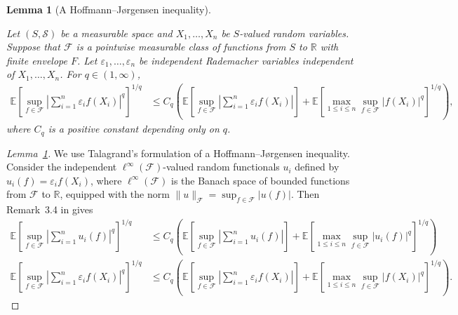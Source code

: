 \documentclass[11pt,lof]{puthesis}
\newcommand{\R}{\ensuremath{\mathbb{R}}}
\newcommand{\E}{\ensuremath{\mathbb{E}}}
\newcommand{\cF}{\ensuremath{\mathcal{F}}}
\newcommand{\cS}{\ensuremath{\mathcal{S}}}
\theoremstyle{break}
\newtheorem{lemma}{Lemma}[section]
\theoremstyle{proof}
\newtheorem{proof}{Proof}
\begin{document}
\begin{lemma}[A Hoffmann--J{\o}rgensen inequality]
  \label{lem:kernel_app_hoffmann}

  Let $(S, \cS)$ be a measurable space
  and $X_1, \ldots, X_n$
  be $S$-valued random variables.
  Suppose that
  $\cF$ is a pointwise measurable class of functions from $S$ to $\R$
  with finite envelope $F$.
  Let $\varepsilon_1, \ldots, \varepsilon_n$
  be independent Rademacher variables
  independent of $X_1, \ldots, X_n$.
  For $q \in (1, \infty)$,
  \begin{align*}
    \E \left[
      \sup_{f \in \cF}
      \left|
      \sum_{i=1}^n
      \varepsilon_i
      f(X_i)
      \right|
      ^q
    \right]
    ^{1/q}
    &\leq
    C_q
    \left(
      \E \left[
        \sup_{f \in \cF}
        \left|
        \sum_{i=1}^n
        \varepsilon_i
        f(X_i)
        \right|
      \right]
      +
      \E \left[
        \max_{1 \leq i \leq n}
        \sup_{f \in \cF}
        \big| f(X_i) \big|^q
      \right]^{1/q}
    \right),
  \end{align*}
  where $C_q$ is a positive constant depending only on $q$.

\end{lemma}

\begin{proof}[Lemma~\ref{lem:kernel_app_hoffmann}]

  We use Talagrand's formulation of
  a Hoffmann--J{\o}rgensen inequality.
  Consider the
  independent
  $\ell^\infty(\cF)$-valued
  random functionals $u_i$ defined by
  $u_i(f) = \varepsilon_i f(X_i)$,
  where $\ell^\infty(\cF)$
  is the Banach space of bounded functions from
  $\cF$ to $\R$,
  equipped with the norm
  $\|u\|_\cF = \sup_{f \in \cF} |u(f)|$.
  Then Remark~3.4 in \citet{kwapien1991hypercontraction} gives
  \begin{align*}
    \E \left[
      \sup_{f \in \cF}
      \left|
      \sum_{i=1}^n
      u_i(f)
      \right|
      ^q
    \right]
    ^{1/q}
    &\leq
    C_q
    \left(
      \E \left[
        \sup_{f \in \cF}
        \left|
        \sum_{i=1}^n
        u_i(f)
        \right|
      \right]
      +
      \E \left[
        \max_{1 \leq i \leq n}
        \sup_{f \in \cF}
        \left|
        u_i(f)
        \right|^q
      \right]^{1/q}
    \right) \\
    \E \left[
      \sup_{f \in \cF}
      \left|
      \sum_{i=1}^n
      \varepsilon_i
      f(X_i)
      \right|
      ^q
    \right]
    ^{1/q}
    &\leq
    C_q
    \left(
      \E \left[
        \sup_{f \in \cF}
        \left|
        \sum_{i=1}^n
        \varepsilon_i
        f(X_i)
        \right|
      \right]
      +
      \E \left[
        \max_{1 \leq i \leq n}
        \sup_{f \in \cF}
        \big| f(X_i) \big|^q
      \right]^{1/q}
    \right).
  \end{align*}
\end{proof}
\end{document}
